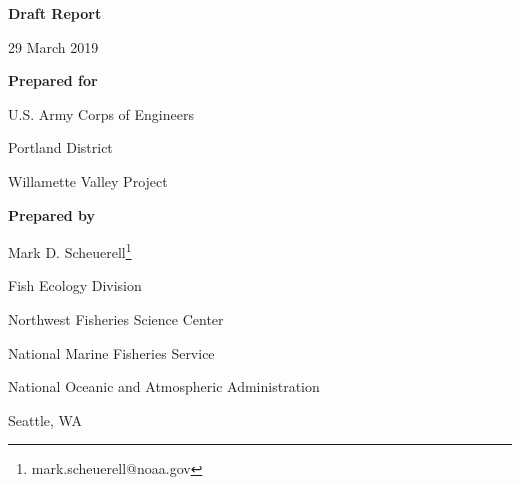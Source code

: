 \begin{center}

\textbf{Draft Report}

29 March 2019

\vspace{0.25in}

\textbf{Prepared for}

U.S. Army Corps of Engineers    

\setlength{\parskip}{0pt}

Portland District    

Willamette Valley Project    

\setlength{\parskip}{8pt}

\vspace{0.25in}

\textbf{Prepared by}

Mark D. Scheuerell\footnote{mark.scheuerell@noaa.gov}

\small

Fish Ecology Division

\setlength{\parskip}{0pt}

Northwest Fisheries Science Center

National Marine Fisheries Service

National Oceanic and Atmospheric Administration

Seattle, WA

\normalsize

\setlength{\parskip}{8pt}

\end{center}

\newpage

